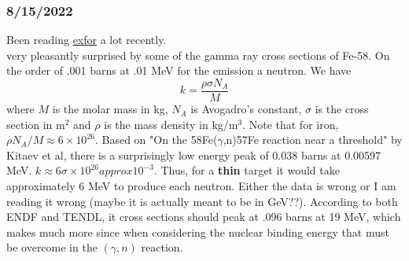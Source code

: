 \documentclass[12pt]{article}
\begin{document}
\subsubsection{8/15/2022}
Been reading \href{https://www-nds.iaea.org/exfor}{exfor} a lot recently. \\
very pleasantly surprised by some of the gamma ray cross sections of Fe-58. On the order of .001 barns at .01 MeV for the emission a neutron. We have 
\begin{equation}
    k = \frac{\rho\sigma N_A}{M}
\end{equation}
where $M$ is the molar mass in kg, $N_A$ is Avogadro's constant, $\sigma$ is the cross section in m$^2$ and $\rho$ is the mass density in kg/m$^3$. Note that for iron, $\rho N_A/M\approx 6\times10^{26}$.
Based on "On the 58Fe($\gamma$,n)57Fe reaction near a threshold" by Kitaev et al, there is a surprisingly low energy peak of 0.038 barns at 0.00597 MeV. 
$k\approx  6\sigma\times10^{26} approx  10^{-3}$. Thus, for a \textbf{thin} target it would take approximately 6 MeV to produce each neutron. Either the data is wrong or I am reading it wrong (maybe it is actually meant to be in GeV??). According to both ENDF and TENDL, it cross sections should peak at .096 barns at 19 MeV, which makes much more since when considering the nuclear binding energy that must be overcome in the $(\gamma,n)$ reaction. 
\end{document}
